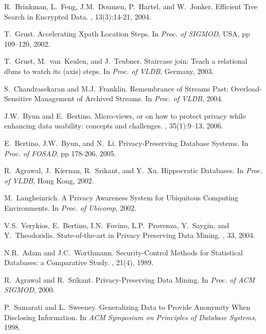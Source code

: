 \begin{thebibliography}{AH89}
R.~Brinkman, L.~Feng, J.M.~Doumen, P.~Hartel, and W.~Jonker.
\newblock Efficient Tree Search in Encrypted Data.
, 13(3):14-21, 2004.

T.~Grust.
\newblock Accelerating Xpath Location Steps.
\newblock In {\em Proc. of SIGMOD}, USA, pp 109--120, 2002.

T.~Grust, M.~van~Keulen, and J.~Teubner.
\newblock Staircase join: Teach a relational dbms to watch its (axis) steps.
\newblock In {\em Proc. of VLDB}, Germany, 2003.

S.~Chandrasekaran and M.J.~Franklin.
\newblock Remembrance of Streams Past: Overload-Sensitive Management of Archived Streams.
\newblock In {\em Proc. of VLDB}, 2004.

J.W.~Byun and E.~Bertino.
\newblock Micro-views, or on how to protect privacy
while enhancing data usability: concepts and challenges.
, 35(1):9--13, 2006.

E.~Bertino, J.W.~Byun, and N.~Li.
\newblock Privacy-Preserving Database Systems.
\newblock In {\em Proc. of FOSAD}, pp 178-206, 2005.

R.~Agrawal, J.~Kiernan, R.~Srikant, and Y.~Xu.
\newblock Hippocratic Databases.
\newblock In {\em Proc. of VLDB}, Hong Kong, 2002.

M.~Langheinrich.
\newblock A Privacy Awareness System for Ubiquitous Computing Environments.
\newblock In {\em Proc. of Ubicomp}, 2002.

V.S.~Verykios, E.~Bertino, I.N.~Fovino, L.P.~Provenza, Y.~Saygin, and Y.~Theodoridis.
\newblock State-of-the-art in Privacy Preserving Data Mining.
, 33, 2004.

N.R.~Adam and J.C.~Worthmann.
\newblock Security-Control Methods for Statistical Databases: a Comparative Study.
, 21(4), 1989.

R.~Agrawal and R.~Srikant.
\newblock Privacy-Preserving Data Mining.
\newblock In {\em Proc. of ACM SIGMOD}, 2000.

P.~Samarati and L.~Sweeney.
\newblock Generalizing Data to Provide Anonymity When Disclosing Information.
\newblock In {\em ACM Symposium on Principles of Database Systems}, 1998.


\end{thebibliography}
